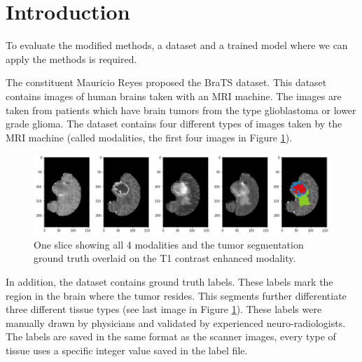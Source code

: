 \section{Introduction}
To evaluate the modified methods, a dataset and a trained model where we can apply the methods is required.

The constituent Mauricio Reyes proposed the BraTS \cite{menze2015multimodal} dataset. This dataset contains
images of human brains taken with an MRI machine. The images are taken from patients which have brain tumors from the type
glioblastoma or lower grade glioma. The dataset contains four different types of images taken by the MRI machine (called modalities, the first four images in Figure \ref{brats_example}).

\begin{figure}[H]
\centering
\includegraphics[width=14cm]{chapters/04_segmentation/images/brats.png}
\caption{One slice showing all 4 modalities and the tumor segmentation ground truth overlaid on the T1 contrast enhanced modality.}
\label{brats_example}
\end{figure}

In addition, the dataset contains ground truth labels. These labels mark the region in the brain where the tumor resides.
This segments further differentiate three different tissue types (see last image in Figure \ref{brats_example}).
These labels were manually drawn by physicians and validated by experienced neuro-radiologists.
The labels are saved in the same format as the scanner images, every type of tissue uses a specific integer value saved in the label file.
